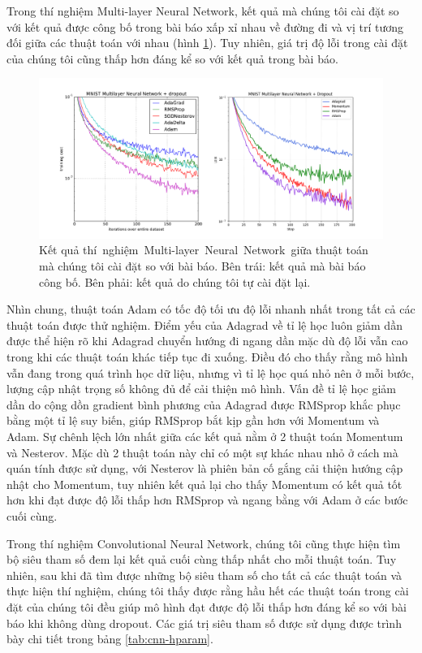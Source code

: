 Trong thí nghiệm Multi-layer Neural Network, kết quả mà chúng tôi cài đặt so với kết quả được công bố trong bài báo xấp xỉ nhau về đường đi và vị trí tương đối giữa các thuật toán với nhau (hình \ref{fig:exp-mlp}). Tuy nhiên, giá trị độ lỗi trong cài đặt của chúng tôi cũng thấp hơn đáng kể so với kết quả trong bài báo.

\begin{figure}[htp]
	\centering
	\includegraphics[width=140 mm]{images/mlp.png}
	\caption{Kết quả thí nghiệm Multi-layer Neural Network giữa thuật toán mà chúng tôi cài đặt so với bài báo. Bên trái: kết quả mà bài báo công bố. Bên phải: kết quả do chúng tôi tự cài đặt lại.}
	\label{fig:exp-mlp}
\end{figure}

Nhìn chung, thuật toán Adam có tốc độ tối ưu độ lỗi nhanh nhất trong tất cả các thuật toán được thử nghiệm. Điểm yếu của Adagrad về tỉ lệ học luôn giảm dần được thể hiện rõ khi Adagrad chuyển hướng đi ngang dần mặc dù độ lỗi vẫn cao trong khi các thuật toán khác tiếp tục đi xuống. Điều đó cho thấy rằng mô hình vẫn đang trong quá trình học dữ liệu, nhưng vì tỉ lệ học quá nhỏ nên ở mỗi bước, lượng cập nhật trọng số không đủ để cải thiện mô hình. Vấn đề tỉ lệ học giảm dần do cộng dồn gradient bình phương của Adagrad được RMSprop khắc phục bằng một tỉ lệ suy biến, giúp RMSprop bắt kịp gần hơn với Momentum và Adam. Sự chênh lệch lớn nhất giữa các kết quả nằm ở 2 thuật toán Momentum và Nesterov. Mặc dù 2 thuật toán này chỉ có một sự khác nhau nhỏ ở cách mà quán tính được sử dụng, với Nesterov là phiên bản cố gắng cải thiện hướng cập nhật cho Momentum, tuy nhiên kết quả lại cho thấy Momentum có kết quả tốt hơn khi đạt được độ lỗi thấp hơn RMSprop và ngang bằng với Adam ở các bước cuối cùng.

Trong thí nghiệm Convolutional Neural Network, chúng tôi cũng thực hiện tìm bộ siêu tham số đem lại kết quả cuối cùng thấp nhất cho mỗi thuật toán. Tuy nhiên, sau khi đã tìm được những bộ siêu tham số cho tất cả các thuật toán và thực hiện thí nghiệm, chúng tôi thấy được rằng hầu hết các thuật toán trong cài đặt của chúng tôi đều giúp mô hình đạt được độ lỗi thấp hơn đáng kể so với bài báo khi không dùng dropout. Các giá trị siêu tham số được sử dụng được trình bày chi tiết trong bảng \ref{tab:cnn-hparam}.

